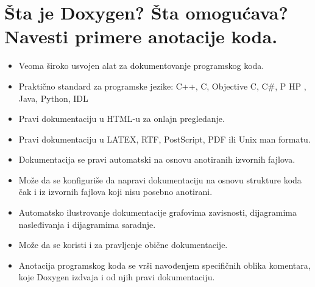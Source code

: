 \documentclass[a4paper]{article}
\begin{document}
\section{Šta je Doxygen? Šta omogućava? Navesti primere anotacije koda.}
  \begin{itemize}
    \item Veoma široko usvojen alat za dokumentovanje programskog koda.
    \item Praktično standard za programske jezike: C++, C, Objective	C, C\#, P HP , Java, Python, IDL
    \item Pravi dokumentaciju u HTML-u za onlajn pregledanje.
    \item Pravi dokumentaciju u LATEX, RTF, PostScript, PDF ili Unix man formatu.
    \item Dokumentacija se pravi automatski na osnovu anotiranih izvornih fajlova. 
    \item Može da se konfiguriše da napravi dokumentaciju na osnovu strukture koda čak i iz 
          izvornih fajlova koji nisu posebno anotirani. 
    \item Automatsko ilustrovanje dokumentacije 
          grafovima zavisnosti, dijagramima nasleđivanja i dijagramima saradnje.
    \item Može da se koristi i za pravljenje obične dokumentacije.
    \item Anotacija programskog koda se vrši navođenjem specifičnih oblika komentara, 
          koje Doxygen izdvaja i od njih pravi dokumentaciju.
  \end{itemize}
\end{document}
